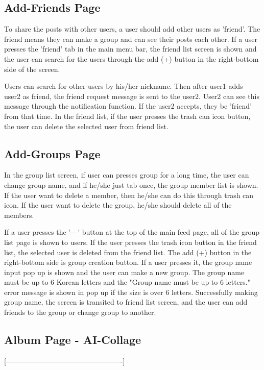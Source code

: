 \documentclass[conference]{IEEEtran}
\begin{document}
    \subsection{Add-Friends Page}
        To share the posts with other users, a user should add other users as 'friend'. The friend means they can make a group and can see their posts each other. If a user presses the 'friend' tab in the main menu bar, the friend list screen is shown and the user can search for the users through the add (+) button in the right-bottom side of the screen.

        Users can search for other users by his/her nickname. Then after user1 adds user2 as friend, the friend request message is sent to the user2. User2 can see this message through the notification function. If the user2 accepts, they be 'friend' from that time. In the friend list, if the user presses the trash can icon button, the user can delete the selected user from friend list.

    \subsection{Add-Groups Page}
        In the group list screen, if user can presses group for a long time, the user can change group name, and if he/she just tab once, the group member list is shown. If the user want to delete a member, then he/she can do this through trash can icon. If the user want to delete the group, he/she should delete all of the members.

        If a user presses the '—' button at the top of the main feed page, all of the group list page is shown to users. If the user presses the trash icon button in the friend list, the selected user is deleted from the friend list. The add (+) button in the right-bottom side is group creation button. If a user presses it, the group name input pop up is shown and the user can make a new group. The group name must be up to 6 Korean letters and the "Group name must be up to 6 letters." error message is shown in pop up if the size is over 6 letters. Successfully making group name, the screen is transited to friend list screen, and the user can add friends to the group or change group to another.

    \subsection{Album Page - AI-Collage}
        [-------------------------------------------------]
\end{document}
